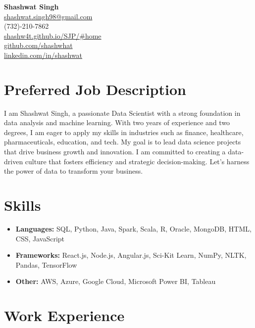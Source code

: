 \documentclass[a4paper,10pt]{article}
\begin{document}
\begin{center}
    \textbf{\Huge Shashwat Singh} \\
    \vspace{1mm}
    \href{mailto:shashwat.singh98@gmail.com}{shashwat.singh98@gmail.com} \\
    (732)-210-7862 \\
    \href{https://shashw4t.github.io/SJP/#home}{shashw4t.github.io/SJP/#home} \\
    \href{https://github.com/shashwhat}{github.com/shashwhat} \\
    \href{https://linkedin.com/in/shashwat}{linkedin.com/in/shashwat} \\
\end{center}

\section{Preferred Job Description}
I am Shashwat Singh, a passionate Data Scientist with a strong foundation in data analysis and machine learning. With two years of experience and two degrees, I am eager to apply my skills in industries such as finance, healthcare, pharmaceuticals, education, and tech. My goal is to lead data science projects that drive business growth and innovation. I am committed to creating a data-driven culture that fosters efficiency and strategic decision-making. Let's harness the power of data to transform your business.

\section{Skills}
\begin{itemize}[leftmargin=0.15in]
    \item \textbf{Languages:} SQL, Python, Java, Spark, Scala, R, Oracle, MongoDB, HTML, CSS, JavaScript
    \item \textbf{Frameworks:} React.js, Node.js, Angular.js, Sci-Kit Learn, NumPy, NLTK, Pandas, TensorFlow
    \item \textbf{Other:} AWS, Azure, Google Cloud, Microsoft Power BI, Tableau
\end{itemize}

\section{Work Experience}
\end{document}
